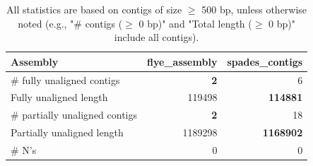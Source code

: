 \documentclass[12pt,a4paper]{article}
\begin{document}
\begin{table}[ht]
\begin{center}
\caption{All statistics are based on contigs of size $\geq$ 500 bp, unless otherwise noted (e.g., "\# contigs ($\geq$ 0 bp)" and "Total length ($\geq$ 0 bp)" include all contigs).}
\begin{tabular}{|l*{2}{|r}|}
\hline
Assembly & flye\_assembly & spades\_contigs \\ \hline
\# fully unaligned contigs & {\bf 2} & 6 \\ \hline
Fully unaligned length & 119498 & {\bf 114881} \\ \hline
\# partially unaligned contigs & {\bf 2} & 18 \\ \hline
Partially unaligned length & 1189298 & {\bf 1168902} \\ \hline
\# N's & 0 & 0 \\ \hline
\end{tabular}
\end{center}
\end{table}
\end{document}
